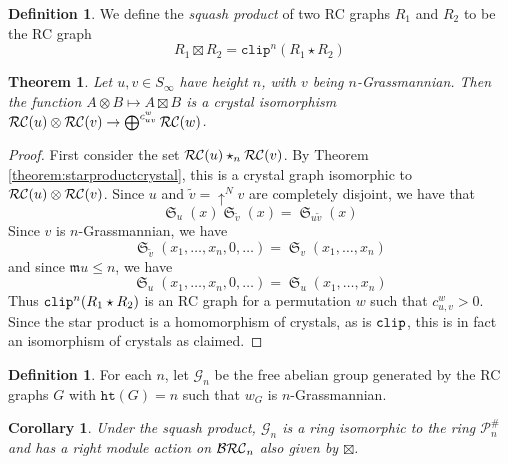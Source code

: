 \documentclass{amsart}
\newtheorem{corollary}[lemma]{Corollary}
\newtheorem{theorem}{Theorem}[section]
\theoremstyle{definition}
\newtheorem{definition}[lemma]{Definition}
\theoremstyle{remark}
\numberwithin{equation}{subsection}
\DeclareMathOperator{\sch}{\mathfrak{S}}
\newcommand{\shup}{{\uparrow}}
\newcommand{\wof}[1]{w_{#1}}
\newcommand{\hr}{\mathtt{ht}}
\newcommand{\maxd}{\mathfrak{m}}
\begin{document}

\begin{definition}
We define the \emph{squash product} of two RC graphs $R_1$ and $R_2$ to be the RC graph
$$R_1\boxtimes R_2 = \mathtt{clip}^n(R_1\star R_2)$$
\end{definition}

\begin{theorem}
Let $u,v\in S_\infty$ have height $n$, with $v$ being $n$-Grassmannian. Then the function $A\otimes B\mapsto A\boxtimes B$ is a crystal isomorphism $\mathcal{RC}(u)\otimes \mathcal{RC}(v)\to \bigoplus^{c_{uv}^w}\mathcal{RC}(w)$.
\end{theorem}
\begin{proof}
First consider the set $\mathcal{RC}(u)\star_n \mathcal{RC}(v)$. By Theorem \ref{theorem:starproductcrystal}, this is a crystal graph isomorphic to $\mathcal{RC}(u)\otimes \mathcal{RC}(v)$. Since $u$ and $\widetilde{v}=\shup^Nv$ are completely  disjoint, we have that
$$\sch_u(x)\sch_{\widetilde{v}}(x) = \sch_{u\widetilde{v}}(x)$$
Since $v$ is $n$-Grassmannian, we have
$$\sch_{\widetilde{v}}(x_1,\ldots,x_n,0,\ldots) = \sch_v(x_1,\ldots,x_n)$$
and since $\maxd{u}\leq n$, we have
$$\sch_{u}(x_1,\ldots,x_n,0,\ldots) = \sch_u(x_1,\ldots,x_n)$$
Thus $\mathtt{clip}^n(R_1\star R_2)$ is an RC graph for a permutation $w$ such that $c_{u,v}^w > 0$. Since the star product is a homomorphism of crystals, as is $\mathtt{clip}$, this is in fact an isomorphism of crystals as claimed.
\end{proof}

\newcommand{\grass}{\mathcal{G}}
\begin{definition}
For each $n$, let $\grass_n$ be the free abelian group generated by the RC graphs $G$ with $\hr(G) = n$ such that $\wof{G}$ is $n$-Grassmannian.
\end{definition}

\begin{corollary}
  Under the squash product, $\grass_n$ is a ring isomorphic to the ring $\mathcal{P}_n^{\#}$ and has a right module action on $\mathcal{BRC}_n$ also given by $\boxtimes$.
\end{corollary}

\end{document}
